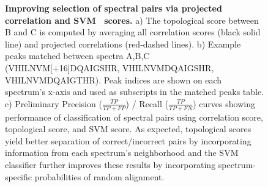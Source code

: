 \documentclass[arial,11pt]{article}
\begin{document}
\begin{figure}[!htb]


\caption{\footnotesize{\bf Improving selection of spectral pairs via projected correlation and SVM~\cite{vapnik95} scores.} a) The topological score between B and C is computed by averaging all correlation scores (black solid line) and projected correlations (red-dashed lines). %
%
b) Example peaks matched between spectra A,B,C (VHILNVM[+16]DQAIGSHR, VHILNVMDQAIGSHR, VHILNVMDQAIGTHR). Peak indices are shown on each spectrum's x-axis and used as subscripts in the matched peaks table.
%
c) Preliminary Precision ($\frac{TP}{TP+FP}$) / Recall ($\frac{TP}{TP+FN}$) curves showing performance of classification of spectral pairs using correlation score, topological score, and SVM score. As expected, topological scores yield better separation of correct/incorrect pairs by incorporating information from each spectrum's neighborhood and the SVM classifier further improves these results by incorporating spectrum-specific probabilities of random alignment.}
\label{trd.snets.fig.neib_correlation}
\end{figure}
\end{document}
